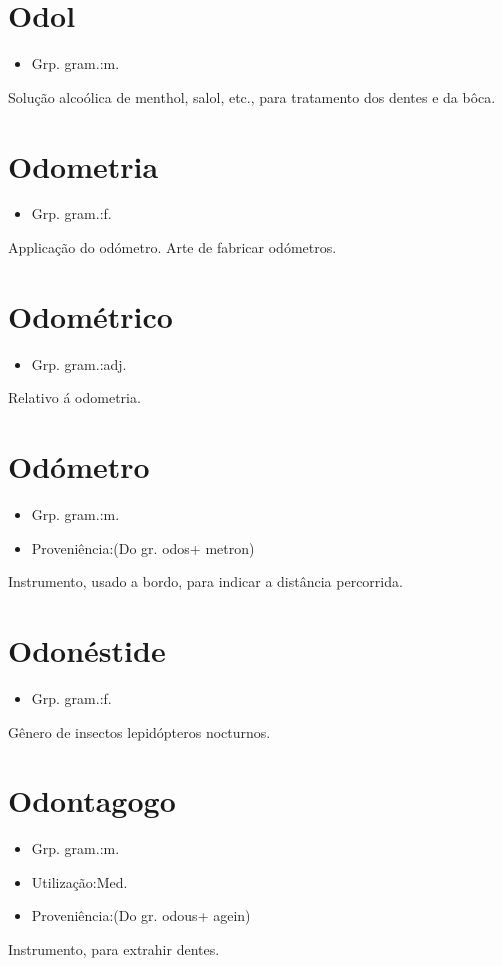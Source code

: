 \section{Odol}
\begin{itemize}
\item {Grp. gram.:m.}
\end{itemize}
Solução alcoólica de menthol, salol, etc., para tratamento dos dentes e da bôca.
\section{Odometria}
\begin{itemize}
\item {Grp. gram.:f.}
\end{itemize}
Applicação do odómetro.
Arte de fabricar odómetros.
\section{Odométrico}
\begin{itemize}
\item {Grp. gram.:adj.}
\end{itemize}
Relativo á odometria.
\section{Odómetro}
\begin{itemize}
\item {Grp. gram.:m.}
\end{itemize}
\begin{itemize}
\item {Proveniência:(Do gr. \textunderscore odos\textunderscore  + \textunderscore metron\textunderscore )}
\end{itemize}
Instrumento, usado a bordo, para indicar a distância percorrida.
\section{Odonéstide}
\begin{itemize}
\item {Grp. gram.:f.}
\end{itemize}
Gênero de insectos lepidópteros nocturnos.
\section{Odontagogo}
\begin{itemize}
\item {Grp. gram.:m.}
\end{itemize}
\begin{itemize}
\item {Utilização:Med.}
\end{itemize}
\begin{itemize}
\item {Proveniência:(Do gr. \textunderscore odous\textunderscore  + \textunderscore agein\textunderscore )}
\end{itemize}
Instrumento, para extrahir dentes.
